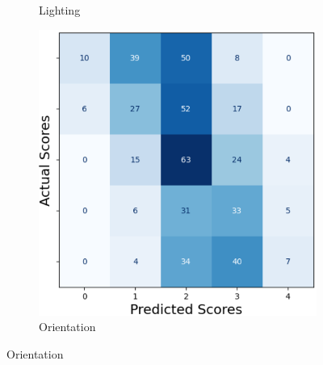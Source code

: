 \begin{figure}[ht]
\begin{subfigure}[b]{0.32\textwidth}
        \caption{Lighting}
        \label{fig:cm_light}
    \end{subfigure}
    \hfill
    \begin{subfigure}[b]{0.32\textwidth}
        \includegraphics[width=\textwidth]{img/cm/orient.png}
        \caption{Orientation}
        \label{fig:cm_orient}
    \end{subfigure} 


\end{figure}
